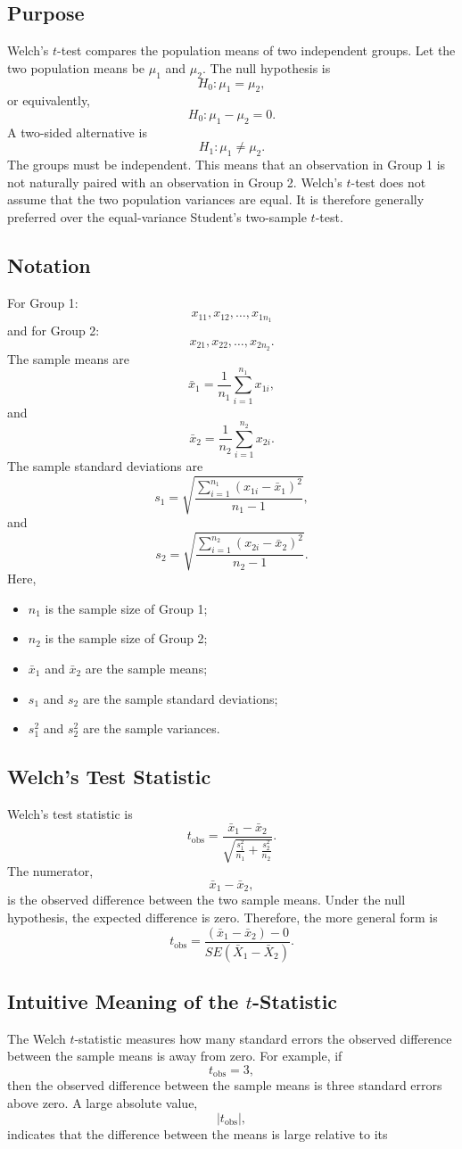\documentclass[11pt]{article}
\begin{document}
\subsection{Purpose} Welch's \(t\)-test compares the population means of two independent groups. Let the two population means be \(\mu_1\) and \(\mu_2\). The null hypothesis is \[ H_0:\mu_1=\mu_2, \] or equivalently, \[ H_0:\mu_1-\mu_2=0. \] A two-sided alternative is \[ H_1:\mu_1\neq\mu_2. \] The groups must be independent. This means that an observation in Group 1 is not naturally paired with an observation in Group 2. Welch's \(t\)-test does not assume that the two population variances are equal. It is therefore generally preferred over the equal-variance Student's two-sample \(t\)-test. \subsection{Notation} For Group 1: \[ x_{11},x_{12},\ldots,x_{1n_1} \] and for Group 2: \[ x_{21},x_{22},\ldots,x_{2n_2}. \] The sample means are \[ \bar{x}_1=\frac{1}{n_1}\sum_{i=1}^{n_1}x_{1i}, \] and \[ \bar{x}_2=\frac{1}{n_2}\sum_{i=1}^{n_2}x_{2i}. \] The sample standard deviations are \[ s_1= \sqrt{ \frac{ \sum_{i=1}^{n_1}(x_{1i}-\bar{x}_1)^2 }{ n_1-1 } }, \] and \[ s_2= \sqrt{ \frac{ \sum_{i=1}^{n_2}(x_{2i}-\bar{x}_2)^2 }{ n_2-1 } }. \] Here, \begin{itemize}[noitemsep] \item \(n_1\) is the sample size of Group 1; \item \(n_2\) is the sample size of Group 2; \item \(\bar{x}_1\) and \(\bar{x}_2\) are the sample means; \item \(s_1\) and \(s_2\) are the sample standard deviations; \item \(s_1^2\) and \(s_2^2\) are the sample variances. \end{itemize} \subsection{Welch's Test Statistic} Welch's test statistic is \[ t_{\mathrm{obs}} = \frac{ \bar{x}_1-\bar{x}_2 }{ \sqrt{ \frac{s_1^2}{n_1} + \frac{s_2^2}{n_2} } }. \] The numerator, \[ \bar{x}_1-\bar{x}_2, \] is the observed difference between the two sample means. Under the null hypothesis, the expected difference is zero. Therefore, the more general form is \[ t_{\mathrm{obs}} = \frac{ (\bar{x}_1-\bar{x}_2)-0 }{ SE(\bar{X}_1-\bar{X}_2) }. \] \subsection{Intuitive Meaning of the \(t\)-Statistic} The Welch \(t\)-statistic measures how many standard errors the observed difference between the sample means is away from zero. For example, if \[ t_{\mathrm{obs}}=3, \] then the observed difference between the sample means is three standard errors above zero. A large absolute value, \[ |t_{\mathrm{obs}}|, \] indicates that the difference between the means is large relative to its 
\end{document}
